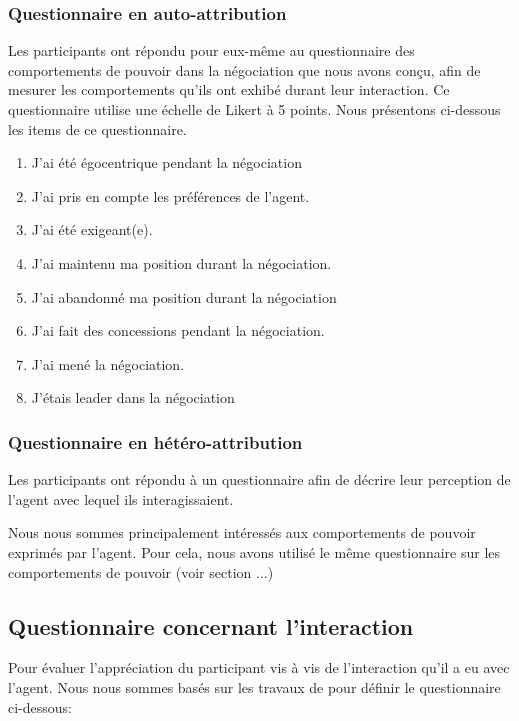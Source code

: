 		\subsubsection{Questionnaire en auto-attribution} Les participants ont répondu pour eux-même au questionnaire des comportements de pouvoir dans la négociation que nous avons conçu, afin de mesurer les comportements qu'ils ont exhibé durant leur interaction. Ce questionnaire utilise une échelle de Likert à 5 points. Nous présentons ci-dessous les items de ce questionnaire. 
		\begin{enumerate}
				\item J'ai été égocentrique pendant la négociation
				\item J'ai pris en compte les préférences de l'agent.
				\item J'ai été exigeant(e).
				\item J'ai maintenu ma position durant la négociation.
				\item J'ai abandonné ma position durant la négociation
				\item J'ai fait des concessions pendant la négociation.	
				\item J'ai mené la négociation.
				\item J'étais leader dans la négociation
		\end{enumerate}
		 
		 \subsubsection{Questionnaire en hétéro-attribution}
		 Les participants ont répondu à un questionnaire afin de décrire leur perception de l’agent avec lequel ils interagissaient.
		 
		 Nous nous sommes principalement intéressés aux comportements de pouvoir exprimés par l'agent. Pour cela, nous avons utilisé le même questionnaire sur les comportements de pouvoir (voir section ...)
 
		 \subsection{Questionnaire concernant l'interaction}
		 Pour évaluer l'appréciation du participant vis à vis de l'interaction qu'il a eu avec l'agent. Nous nous sommes basés sur les travaux de \cite{tiedens2003power,wiltermuth2009benefits,olekalns2013dyadic} pour définir le questionnaire ci-dessous:
		
